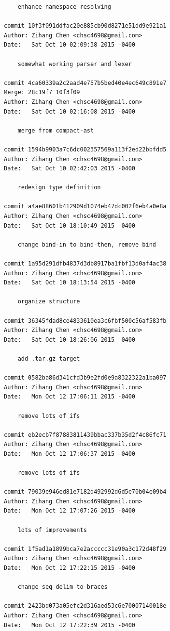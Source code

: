 \documentclass{report}
\begin{document}
\begin{appendices}
\begin{verbatim}
    enhance namespace resolving

commit 10f3f091ddfac20e885cb90d8271e51dd9e921a1
Author: Zihang Chen <chsc4698@gmail.com>
Date:   Sat Oct 10 02:09:38 2015 -0400

    somewhat working parser and lexer

commit 4ca60339a2c2aad4e757b5bed40e4ec649c891e7
Merge: 28c19f7 10f3f09
Author: Zihang Chen <chsc4698@gmail.com>
Date:   Sat Oct 10 02:16:08 2015 -0400

    merge from compact-ast

commit 1594b9903a7c6dc002357569a113f2ed22bbfdd5
Author: Zihang Chen <chsc4698@gmail.com>
Date:   Sat Oct 10 02:42:03 2015 -0400

    redesign type definition

commit a4ae88601b412909d1074eb47dc002f6eb4a0e8a
Author: Zihang Chen <chsc4698@gmail.com>
Date:   Sat Oct 10 18:10:49 2015 -0400

    change bind-in to bind-then, remove bind

commit 1a95d291dfb4837d3db8917ba1fbf13d0af4ac38
Author: Zihang Chen <chsc4698@gmail.com>
Date:   Sat Oct 10 18:13:54 2015 -0400

    organize structure

commit 36345fdad8ce4833610ea3c6fbf500c56af583fb
Author: Zihang Chen <chsc4698@gmail.com>
Date:   Sat Oct 10 18:26:06 2015 -0400

    add .tar.gz target

commit 0582ba86d341cfd3b9e2fd0e9a8322322a1ba097
Author: Zihang Chen <chsc4698@gmail.com>
Date:   Mon Oct 12 17:06:11 2015 -0400

    remove lots of ifs

commit eb2ecb7f87883811439bbac337b35d2f4c86fc71
Author: Zihang Chen <chsc4698@gmail.com>
Date:   Mon Oct 12 17:06:37 2015 -0400

    remove lots of ifs

commit 79039e946ed81e7182d492992d6d5e70b04e09b4
Author: Zihang Chen <chsc4698@gmail.com>
Date:   Mon Oct 12 17:07:26 2015 -0400

    lots of improvements

commit 1f5ad1a1899bca7e2accccc31e90a3c172d48f29
Author: Zihang Chen <chsc4698@gmail.com>
Date:   Mon Oct 12 17:22:15 2015 -0400

    change seq delim to braces

commit 2423bd073a05efc2d316aed53c6e70007140018e
Author: Zihang Chen <chsc4698@gmail.com>
Date:   Mon Oct 12 17:22:39 2015 -0400


\end{verbatim}
\end{appendices}
\end{document}
